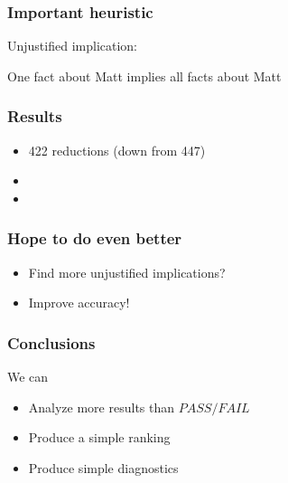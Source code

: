 \documentclass[svgnames,14pt]{beamer}
\newcommand\fail{\mathit{FAIL}}
\newcommand\pass{\mathit{PASS}}
\theoremstyle{definition}
\begin{document}
\begin{frame}
\frametitle{Important heuristic}
Unjustified implication:
\begin{block}{}
One fact about Matt implies all facts about Matt
\end{block}
\end{frame}

\begin{frame}
\frametitle{Results}
\begin{itemize}
\item 422 reductions (down from 447)
\item {} 
\item {}
\end{itemize}
\end{frame}

\begin{frame}
\frametitle{Hope to do even better}
\begin{itemize}
\item
Find more unjustified implications?
\item
Improve accuracy!
\end{itemize}
\end{frame}

\begin{frame}
\frametitle{Conclusions}
We can
\begin{itemize}
\item<2-> Analyze more results than $\pass/\fail$
\item<3-> Produce a simple ranking 
\item<4-> Produce simple diagnostics 
\end{itemize}
\end{frame}
\end{document}

